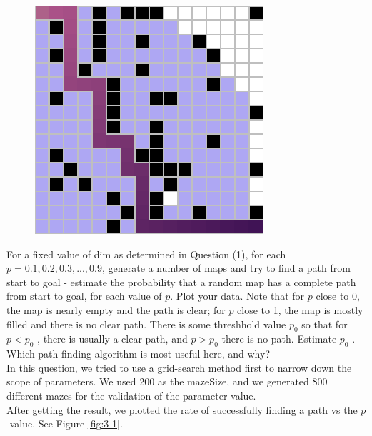 \documentclass[letter]{article}
\begin{document}
\begin{questions}
\begin{figure}
		\caption{}\label{fig:q2-17}
		\endminipage\hfill
		\includegraphics[width=\linewidth]{../pics/16/Ac 159 31 24.png}
		\caption{}\label{fig:q2-18}
		\endminipage
	\end{figure}
	
	
	\item {For a fixed value of dim as determined in Question (1), for each $ p = 0.1, 0.2, 0.3, ... , 0.9 $, generate a number of maps and try to find a path from start to goal - estimate the probability that a random map has a complete path from start to goal, for each value of $ p $. Plot your data. Note that for $ p $ close to 0, the map is nearly empty and the path is clear; for $ p $ close to 1, the map is mostly filled and there is no clear path. There is some threshhold value $ p_0 $ so that for $ p < p_0 $ , there is usually a clear path, and $ p > p_0 $ there is no path. Estimate $ p_0 $ . Which path finding algorithm is most useful here, and why?} \\
	
	In this question, we tried to use a grid-search method first to narrow down the scope of parameters. We used 200 as the mazeSize, and we generated 800 different mazes for the validation of the parameter value. \\
	
	After getting the result, we plotted the rate of successfully finding a path vs the $ p $-value. See Figure \ref{fig:3-1}. \\
	

\end{questions}
\end{document}
